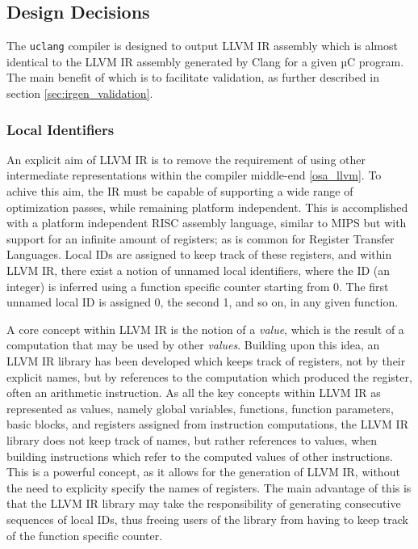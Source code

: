 \subsection{Design Decisions}

The \texttt{uclang} compiler is designed to output LLVM IR assembly which is almost identical to the LLVM IR assembly generated by Clang for a given µC program. The main benefit of which is to facilitate validation, as further described in section \ref{sec:irgen_validation}.

\subsubsection{Local Identifiers}

An explicit aim of LLVM IR is to remove the requirement of using other intermediate representations within the compiler middle-end \ref{osa_llvm}. To achive this aim, the IR must be capable of supporting a wide range of optimization passes, while remaining platform independent. This is accomplished with a platform independent RISC assembly language, similar to MIPS but with support for an infinite amount of registers; as is common for Register Transfer Languages. Local IDs are assigned to keep track of these registers, and within LLVM IR, there exist a notion of unnamed local identifiers, where the ID (an integer) is inferred using a function specific counter starting from 0. The first unnamed local ID is assigned 0, the second 1, and so on, in any given function.

A core concept within LLVM IR is the notion of a \textit{value}, which is the result of a computation that may be used by other \textit{values}. Building upon this idea, an LLVM IR library has been developed which keeps track of registers, not by their explicit names, but by references to the computation which produced the register, often an arithmetic instruction. As all the key concepts within LLVM IR as represented as values, namely global variables, functions, function parameters, basic blocks, and registers assigned from instruction computations, the LLVM IR library does not keep track of names, but rather references to values, when building instructions which refer to the computed values of other instructions. This is a powerful concept, as it allows for the generation of LLVM IR, without the need to explicity specify the names of registers. The main advantage of this is that the LLVM IR library may take the responsibility of generating consecutive sequences of local IDs, thus freeing users of the library from having to keep track of the function specific counter.

